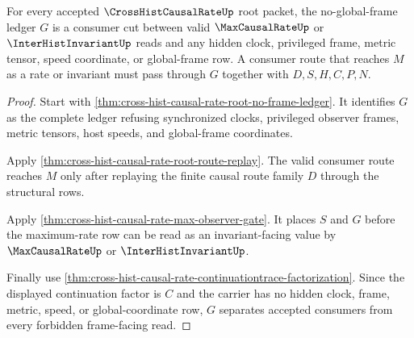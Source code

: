 \begin{theorem}
\label{thm:cross-hist-causal-rate-root-no-frame-consumer-cut}
For every accepted $\CrossHistCausalRateUp$ root packet, the no-global-frame ledger $G$ is a consumer cut between valid $\MaxCausalRateUp$ or $\InterHistInvariantUp$ reads and any hidden clock, privileged frame, metric tensor, speed coordinate, or global-frame row. A consumer route that reaches $M$ as a rate or invariant must pass through $G$ together with $D,S,H,C,P,N$.
\end{theorem}
\begin{proof}
Start with \autoref{thm:cross-hist-causal-rate-root-no-frame-ledger}. It identifies $G$ as the complete ledger refusing synchronized clocks, privileged observer frames, metric tensors, host speeds, and global-frame coordinates.

Apply \autoref{thm:cross-hist-causal-rate-root-route-replay}. The valid consumer route reaches $M$ only after replaying the finite causal route family $D$ through the structural rows.

Apply \autoref{thm:cross-hist-causal-rate-max-observer-gate}. It places $S$ and $G$ before the maximum-rate row can be read as an invariant-facing value by $\MaxCausalRateUp$ or $\InterHistInvariantUp$.

Finally use \autoref{thm:cross-hist-causal-rate-continuationtrace-factorization}. Since the displayed continuation factor is $C$ and the carrier has no hidden clock, frame, metric, speed, or global-coordinate row, $G$ separates accepted consumers from every forbidden frame-facing read.
\end{proof}

